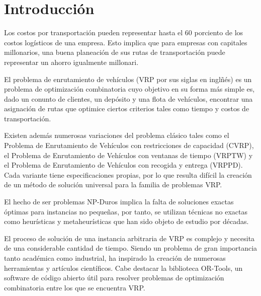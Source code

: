 \chapter*{Introducción}\label{chapter:introduction}

\qquad 
Los costos por transportación pueden representar hasta el 60 porciento de los costos logísticos de una empresa. Esto implica que para empresas con capitales millonarios, una buena planeación de sus rutas de transportación puede representar un ahorro igualmente millonari.

El problema de enrutamiento de vehículos (VRP por sus siglas en inglñés) es un problema de optimización combinatoria cuyo objetivo en su forma más simple es, dado un conunto de clientes, un depósito y una flota de vehículos, encontrar una asignación de rutas que optimice ciertos criterios tales como tiempo y costos de transportación.

Existen además numerosas variaciones del problema clásico tales como el Problema de Enrutamiento de Vehículos con restricciones de capacidad (CVRP), el Problema de Enrutamiento de Vehículos con ventanas de tiempo (VRPTW) y el Problema de Enrutamiento de Vehículos con recogida y entrega (VRPPD). Cada variante tiene especificaciones propias, por lo que resulta difícil la creación de un método de solución universal para la familia de problemas VRP.

El hecho de ser problemas NP-Duros implica la falta de soluciones exactas óptimas para instancias no pequeñas, por tanto, se utilizan técnicas no exactas como heurísticas y metaheurísticas que han sido objeto de estudio por décadas.

El proceso de solución de una instancia arbitraria de VRP es complejo y necesita de una considerable cantidad de tiempo. Siendo un problema de gran importancia tanto académica como industrial, ha inspirado la creación de numerosas herramientas y artículos científicos. Cabe destacar la biblioteca OR-Tools, un software de código abierto útil para resolver problemas de optimización combinatoria entre los que se encuentra VRP.

